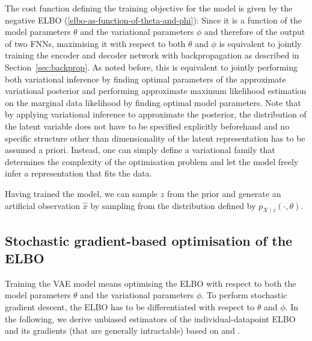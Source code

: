 The cost function defining the training objective for the model is given by the negative ELBO (\ref{elbo-as-function-of-theta-and-phi}): Since it is a function of the model parameters $\theta$ and the variational parameters $\phi$ and therefore of the output of two FNNs, maximising it with respect to both $\theta$ and $\phi$ is equivalent to jointly training the encoder and decoder network with backpropagation as described in Section~\ref{sec:backprop}. As noted before, this is equivalent to jointly performing both variational inference by finding optimal parameters of the approximate variational posterior and performing approximate maximum likelihood estimation on the marginal data likelihood by finding optimal model parameters. Note that by applying variational inference to approximate the posterior, the distribution of the latent variable does not have to be specified explicitly beforehand and no specific structure other than dimensionality of the latent representation has to be assumed a priori. Instead, one can simply define a variational family that determines the complexity of the optimisation problem and let the model freely infer a representation that fits the data. 

Having trained the model, we can sample $z$ from the prior and generate an artificial observation $\hat{x}$ by sampling from the distribution defined by $p_{X\mid z}(\cdot,\theta)$.

\subsection{Stochastic gradient-based optimisation of the ELBO}\label{sec:ELBO-optimisation}

Training the VAE model means optimising the ELBO with respect to both the model parameters $\theta$ and the variational parameters $\phi$. To perform stochastic gradient descent, the ELBO has to be differentiated with respect to $\theta$ and $\phi$. 
In the following, we derive unbiased estimators of the individual-datapoint ELBO and its gradients (that are generally intractable) based on \cite[pp.~19-23]{Kingma2019} and \cite[pp.~3-5]{Kingma2013}. 


